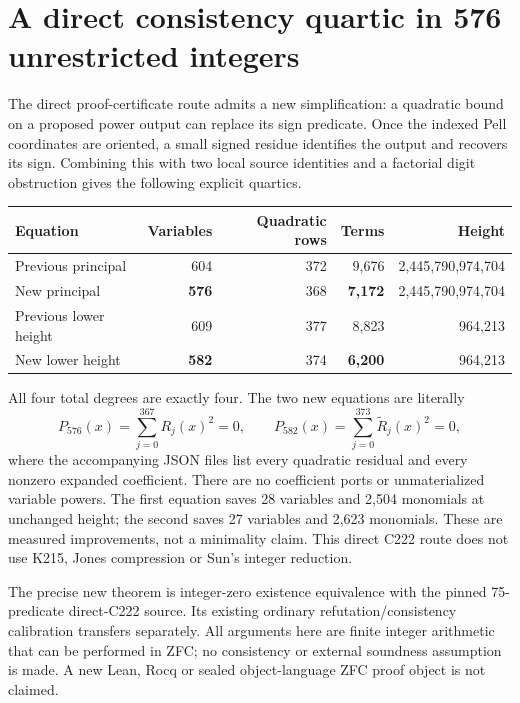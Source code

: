 \section{A direct consistency quartic in 576 unrestricted integers}
\label{sec:direct576}

The direct proof-certificate route admits a new simplification: a
quadratic bound on a proposed power output can replace its sign
predicate.  Once the indexed Pell coordinates are oriented, a small
signed residue identifies the output and recovers its sign.  Combining
this with two local source identities and a factorial digit obstruction
gives the following explicit quartics.

\begin{center}\small
\begin{tabular}{lrrrr}
\hline
Equation & Variables & Quadratic rows & Terms & Height\\
\hline
Previous principal &604&372&9,676&2,445,790,974,704\\
New principal &\textbf{576}&368&\textbf{7,172}&2,445,790,974,704\\
Previous lower height &609&377&8,823&964,213\\
New lower height &\textbf{582}&374&\textbf{6,200}&964,213\\
\hline
\end{tabular}
\end{center}

All four total degrees are exactly four.  The two new equations are
literally
\[
 P_{576}(x)=\sum_{j=0}^{367}R_j(x)^2=0,
 \qquad
 P_{582}(x)=\sum_{j=0}^{373}\widetilde R_j(x)^2=0,
\]
where the accompanying JSON files list every quadratic residual and
every nonzero expanded coefficient.  There are no coefficient ports or
unmaterialized variable powers.  The first equation saves 28 variables
and 2,504 monomials at unchanged height; the second saves 27 variables
and 2,623 monomials.  These are measured improvements, not a minimality
claim.  This direct C222 route does not use K215, Jones compression or
Sun's integer reduction.

The precise new theorem is integer-zero existence equivalence with the
pinned 75-predicate direct-C222 source.  Its existing ordinary
refutation/consistency calibration transfers separately.  All arguments
here are finite integer arithmetic that can be performed in ZFC; no
consistency or external soundness assumption is made.  A new Lean,
Rocq or sealed object-language ZFC proof object is not claimed.

